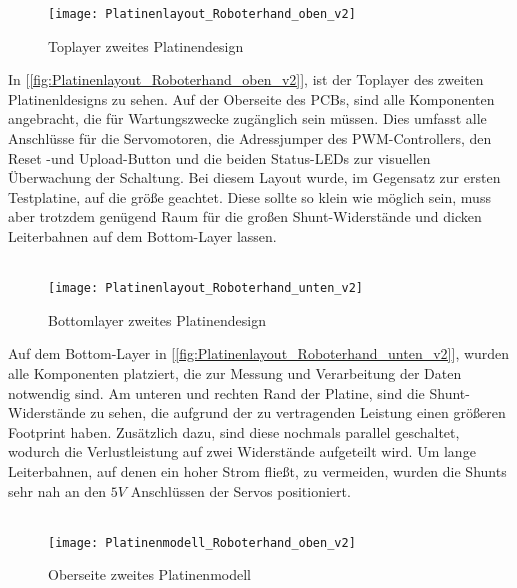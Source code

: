 \documentclass[titlepage,12pt,twoside]{article}
\begin{document}
\begin{figure}[H]
	\begin{center}
		\scalebox{0.8}
		{\texttt{[image: Platinenlayout\_Roboterhand\_oben\_v2]}}
		\caption{Toplayer zweites Platinendesign}
		\label{fig:Platinenlayout_Roboterhand_oben_v2}	
	\end{center}
\end{figure}
\hfill \break
In [\textcolor{blue}{\autoref{fig:Platinenlayout_Roboterhand_oben_v2}}], ist der Toplayer des zweiten Platinenldesigns zu sehen. Auf der Oberseite des
PCBs, sind alle Komponenten angebracht, die für Wartungszwecke zugänglich sein müssen. Dies umfasst alle Anschlüsse für die Servomotoren,
die Adressjumper des PWM-Controllers, den Reset -und Upload-Button und die beiden Status-LEDs zur visuellen Überwachung der Schaltung. 
Bei diesem Layout wurde, im Gegensatz zur ersten Testplatine, auf die größe geachtet. Diese sollte so klein wie möglich sein, muss
aber trotzdem genügend Raum für die großen Shunt-Widerstände und dicken Leiterbahnen auf dem Bottom-Layer lassen. \\
\\
\begin{figure}[H]
	\begin{center}
		\scalebox{0.8}
		{\texttt{[image: Platinenlayout\_Roboterhand\_unten\_v2]}}
		\caption{Bottomlayer zweites Platinendesign}
		\label{fig:Platinenlayout_Roboterhand_unten_v2}		
	\end{center}
\end{figure}
\hfill \break
Auf dem Bottom-Layer in [\textcolor{blue}{\autoref{fig:Platinenlayout_Roboterhand_unten_v2}}], wurden alle Komponenten platziert, die zur Messung und Verarbeitung
der Daten notwendig sind. Am unteren und rechten Rand der Platine, sind die Shunt-Widerstände zu sehen, die aufgrund der zu vertragenden
Leistung einen größeren Footprint haben. Zusätzlich dazu, sind diese nochmals parallel geschaltet, wodurch die Verlustleistung auf 
zwei Widerstände aufgeteilt wird. Um lange Leiterbahnen, auf denen ein hoher Strom fließt, zu vermeiden, wurden die Shunts sehr nah 
an den $5V$ Anschlüssen der Servos positioniert. \\
\\
\begin{figure}[H]
	\begin{center}
		\scalebox{0.8}
		{\texttt{[image: Platinenmodell\_Roboterhand\_oben\_v2]}}
		\caption{Oberseite zweites Platinenmodell}
		\label{fig:Platinenmodell_Roboterhand_oben_v2}		
	\end{center}
\end{figure}
\end{document}
